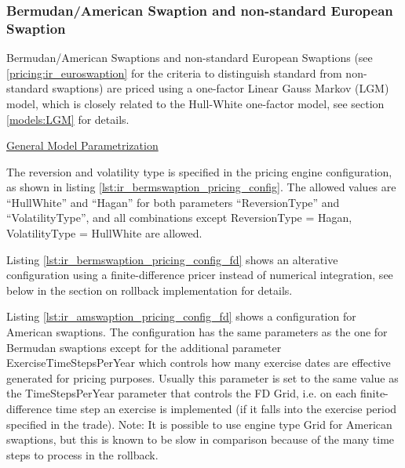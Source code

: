 \subsubsection{Bermudan/American Swaption and non-standard European Swaption}
\label{pricing:ir_bermswaption}

Bermudan/American Swaptions and non-standard European Swaptions (see \ref{pricing:ir_euroswaption} for the criteria to
distinguish standard from non-standard swaptions) are priced using a one-factor Linear Gauss Markov (LGM) model, which
is closely related to the Hull-White one-factor model, see section \ref{models:LGM} for details.

\underline{General Model Parametrization}

The reversion and volatility type is specified in the pricing engine configuration, as shown in listing
\ref{lst:ir_bermswaption_pricing_config}. The allowed values are ``HullWhite'' and ``Hagan'' for both parameters
``ReversionType'' and ``VolatilityType'', and all combinations except ReversionType = Hagan, VolatilityType = HullWhite
are allowed.

Listing \ref{lst:ir_bermswaption_pricing_config_fd} shows an alterative configuration using a finite-difference pricer
instead of numerical integration, see below in the section on rollback implementation for details.

Listing \ref{lst:ir_amswaption_pricing_config_fd} shows a configuration for American swaptions. The configuration has
the same parameters as the one for Bermudan swaptions except for the additional parameter ExerciseTimeStepsPerYear which
controls how many exercise dates are effective generated for pricing purposes. Usually this parameter is set to the same
value as the TimeStepsPerYear parameter that controls the FD Grid, i.e. on each finite-difference time step an exercise
is implemented (if it falls into the exercise period specified in the trade). Note: It is possible to use engine type
Grid for American swaptions, but this is known to be slow in comparison because of the many time steps to process in the
rollback.


